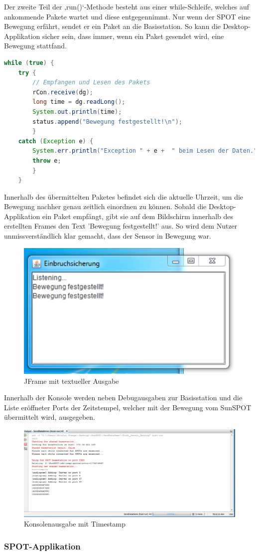Der zweite Teil der ‚run()‘-Methode besteht aus einer while-Schleife, welches auf ankommende Pakete wartet und diese entgegennimmt. Nur wenn der SPOT eine Bewegung erfährt, sendet er ein Paket an die Basisstation. So kann die Desktop-Applikation sicher sein, dass immer, wenn ein Paket gesendet wird, eine Bewegung stattfand.\\

\begin{lstlisting}[language=Java,caption={Auswerten des empfangenen Paketes},label=lst:rcvpackage,frame=single] 
while (true) {
	try {
		// Empfangen und Lesen des Pakets
		rCon.receive(dg);
		long time = dg.readLong();
		System.out.println(time);
		status.append("Bewegung festgestellt!\n");
		} 
	catch (Exception e) {
		System.err.println("Exception " + e +  " beim Lesen der Daten.");
		throw e;
		}
	}
\end{lstlisting}

Innerhalb des übermittelten Paketes befindet sich die aktuelle Uhrzeit, um die Bewegung nachher genau zeitlich einordnen zu können. Sobald die Desktop-Applikation ein Paket empfängt, gibt sie auf dem Bildschirm innerhalb des erstellten Frames den Text 'Bewegung festgestellt!' aus. So wird dem Nutzer unmissverständlich klar gemacht, dass der Sensor in Bewegung war.

\begin{figure}[H] 
	\centering
	\includegraphics[scale=1.0]{Bilder/bewegung}
	\caption{JFrame mit textueller Ausgabe}
	\label{f:bewegung}
\end{figure}

Innerhalb der Konsole werden neben Debugausgaben zur Basisstation und die Liste eröffneter Ports der Zeitstempel, welcher mit der Bewegung vom SunSPOT übermittelt wird, ausgegeben.

\begin{figure}[H] 
	\centering
	\includegraphics[scale=0.5]{Bilder/timestamp}
	\caption{Konsolenausgabe mit Timestamp}
	\label{f:timestamp}
\end{figure}

\subsubsection{SPOT-Applikation}\label{sss:SPOT-Applikation}